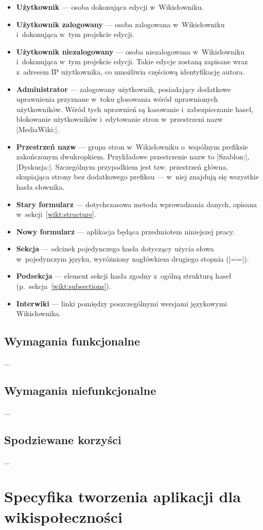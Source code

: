 \begin{itemize}
\item \textbf{Użytkownik} --- osoba dokonująca edycji w~Wikisłowniku.
\item \textbf{Użytkownik zalogowany} --- osoba zalogowana w~Wikisłowniku i~dokonująca w~tym projekcie edycji.
\item \textbf{Użytkownik niezalogowany} --- osoba niezalogowana w~Wikisłowniku i~dokonująca w~tym projekcie edycji. Takie edycje zostaną zapisane wraz z~adresem IP użytkownika, co umożliwia częściową identyfikację autora.
\item \textbf{Administrator} --- zalogowany użytkownik, posiadający dodatkowe uprawnienia przyznane w~toku głosowania wśród uprawnionych użytkowników. Wśród tych uprawnień są kasowanie i~zabezpieczanie haseł, blokowanie użytkowników i~edytowanie stron w~przestrzeni nazw \kod|MediaWiki:|.
\item \textbf{Przestrzeń nazw} --- grupa stron w~Wikisłowniku o~wspólnym prefiksie zakończonym dwukropkiem. Przykładowe przestrzenie nazw to \kod|Szablon:|, \kod|Dyskusja:|. Szczególnym przypadkiem jest tzw. przestrzeń główna, skupiająca strony bez dodatkowego prefiksu --- w~niej znajdują się wszystkie hasła słownika.
\item \textbf{Stary formularz} --- dotychczasowa metoda wprowadzania danych, opisana w~sekcji~\ref{wikt:structure}.
\item \textbf{Nowy formularz} --- aplikacja będąca przedmiotem niniejszej pracy.
\item \textbf{Sekcja} --- odcinek pojedynczego hasła dotyczący użycia słowa w~pojedynczym języku, wyróżniony nagłówkiem drugiego stopnia (\kod|==|).
\item \textbf{Podsekcja} --- element sekcji hasła zgodny z~ogólną strukturą haseł (p.~sekcja~\ref{wikt:subsections}).
\item \textbf{Interwiki} --- linki pomiędzy poszczególnymi wersjami językowymi Wikisłownika.
\end{itemize}

\subsection{Wymagania funkcjonalne}
...
\subsection{Wymagania niefunkcjonalne}
...
\subsection{Spodziewane korzyści}
...

\section{Specyfika tworzenia aplikacji dla wikispołeczności}
\label{sec:spec}
